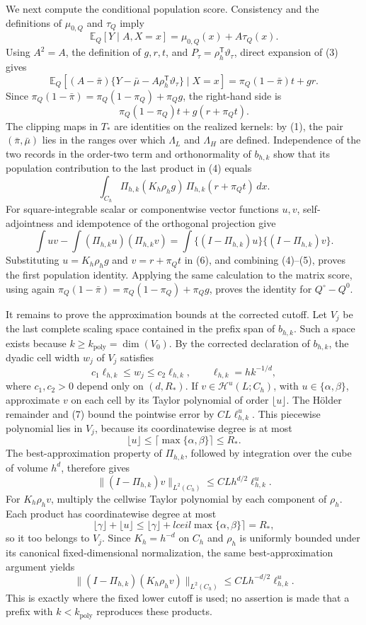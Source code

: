 We next compute the conditional population score.  Consistency and the definitions of \(\mu_{0,Q}\) and \(\tau_Q\) imply
\[
 \mathbb E_Q[Y\mid A,X=x]=\mu_{0,Q}(x)+A\tau_Q(x).
\tag{3}
\]
Using \(A^2=A\), the definition of \(g,r,t\), and \(P_\tau=\rho_h^{\mathsf T}\vartheta_\tau\), direct expansion of (3) gives
\[
 \mathbb E_Q\!\left[(A-\bar\pi)
       \{Y-\bar\mu-A\rho_h^{\mathsf T}\vartheta_\tau\}\mid X=x\right]
 =\pi_Q(1-\bar\pi)t+gr.
\]
Since \(\pi_Q(1-\bar\pi)=\pi_Q(1-\pi_Q)+\pi_Qg\), the right-hand side is
\[
 \pi_Q(1-\pi_Q)t+g(r+\pi_Qt).
\tag{4}
\]
The clipping maps in \(T_*\) are identities on the realized kernels: by (1), the pair \((\bar\pi,\bar\mu)\) lies in the ranges over which \(\Lambda_L\) and \(\Lambda_H\) are defined.  Independence of the two records in the order-two term and orthonormality of \(b_{h,k}\) show that its population contribution to the last product in (4) equals
\[
 \int_{C_h}\Pi_{h,k}(K_h\rho_hg)\,
                  \Pi_{h,k}(r+\pi_Qt)\,dx.
\tag{5}
\]
For square-integrable scalar or componentwise vector functions \(u,v\), self-adjointness and idempotence of the orthogonal projection give
\[
 \int uv-\int(\Pi_{h,k}u)(\Pi_{h,k}v)
 =\int\{(I-\Pi_{h,k})u\}\{(I-\Pi_{h,k})v\}.
\tag{6}
\]
Substituting \(u=K_h\rho_hg\) and \(v=r+\pi_Qt\) in (6), and combining (4)--(5), proves the first population identity.  Applying the same calculation to the matrix score, using again \(\pi_Q(1-\bar\pi)=\pi_Q(1-\pi_Q)+\pi_Qg\), proves the identity for \(Q^\circ-Q^0\).

It remains to prove the approximation bounds at the corrected cutoff.  Let \(V_j\) be the last complete scaling space contained in the prefix span of \(b_{h,k}\).  Such a space exists because \(k\ge k_{\mathrm{poly}}=\dim(V_0)\).  By the corrected declaration of \(b_{h,k}\), the dyadic cell width \(w_j\) of \(V_j\) satisfies
\[
 c_1\ell_{h,k}\le w_j\le c_2\ell_{h,k},
 \qquad \ell_{h,k}=hk^{-1/d},
\tag{7}
\]
where \(c_1,c_2>0\) depend only on \((d,R_*)\).  If \(v\in\mathcal H^u(L;C_h)\), with \(u\in\{\alpha,\beta\}\), approximate \(v\) on each cell by its Taylor polynomial of order \(\lfloor u\rfloor\).  The H\"older remainder and (7) bound the pointwise error by \(CL\ell_{h,k}^u\).  This piecewise polynomial lies in \(V_j\), because its coordinatewise degree is at most
\[
 \lfloor u\rfloor\le\lceil\max\{\alpha,\beta\}\rceil\le R_*.
\]
The best-approximation property of \(\Pi_{h,k}\), followed by integration over the cube of volume \(h^d\), therefore gives
\[
 \lVert(I-\Pi_{h,k})v\rVert_{L^2(C_h)}
 \le CLh^{d/2}\ell_{h,k}^u.
\tag{8}
\]
For \(K_h\rho_hv\), multiply the cellwise Taylor polynomial by each component of \(\rho_h\).  Each product has coordinatewise degree at most
\[
 \lfloor\gamma\rfloor+\lfloor u\rfloor
 \le\lfloor\gamma\rfloor+lceil\max\{\alpha,\beta\}\rceil=R_*,
\]
so it too belongs to \(V_j\).  Since \(K_h=h^{-d}\) on \(C_h\) and \(\rho_h\) is uniformly bounded under its canonical fixed-dimensional normalization, the same best-approximation argument yields
\[
 \lVert(I-\Pi_{h,k})(K_h\rho_hv)\rVert_{L^2(C_h)}
 \le CLh^{-d/2}\ell_{h,k}^u.
\tag{9}
\]
This is exactly where the fixed lower cutoff is used; no assertion is made that a prefix with \(k<k_{\mathrm{poly}}\) reproduces these products.

